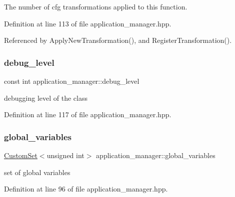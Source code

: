 The number of cfg transformations applied to this function. 



Definition at line 113 of file application\+\_\+manager.\+hpp.



Referenced by Apply\+New\+Transformation(), and Register\+Transformation().

\mbox{\label{classapplication__manager_aa9ca2ad41798ce33f8f96f3e4f035756}} 
\subsubsection{\texorpdfstring{debug\+\_\+level}{debug\_level}}
{\footnotesize\ttfamily const int application\+\_\+manager\+::debug\+\_\+level\hspace{0.3cm}{\ttfamily [protected]}}



debugging level of the class 



Definition at line 117 of file application\+\_\+manager.\+hpp.

\mbox{\label{classapplication__manager_ac1a43ee7ae1155ff55f0073ef289b85a}} 
\subsubsection{\texorpdfstring{global\+\_\+variables}{global\_variables}}
{\footnotesize\ttfamily \hyperlink{custom__set_8hpp_a615bc2f42fc38a4bb1790d12c759e86f}{Custom\+Set}$<$unsigned int$>$ application\+\_\+manager\+::global\+\_\+variables\hspace{0.3cm}{\ttfamily [protected]}}



set of global variables 



Definition at line 96 of file application\+\_\+manager.\+hpp.




